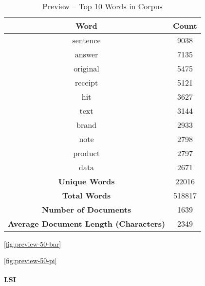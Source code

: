 \documentclass[letterpaper,12pt]{article}
\begin{document}
\begin{table}
	\caption{\label{tab:preview_top_words} Preview -- Top 10 Words in Corpus}
	\begin{center}
		\begin{tabular}{|c|c|}
			\hline
			\textbf{Word} & \textbf{Count} \\
			\hline
			sentence & 9038 \\
			\hline
			answer & 7135 \\
			\hline
			original & 5475 \\
			\hline
			receipt & 5121 \\
			\hline
			hit & 3627 \\
			\hline
			text & 3144 \\
			\hline
			brand & 2933 \\
			\hline
			note & 2798 \\
			\hline
			product & 2797 \\
			\hline
			data & 2671 \\
			\hline
			\textbf{Unique Words} & 22016 \\
			\hline
			\textbf{Total Words} & 518817 \\
			\hline
			\textbf{Number of Documents} & 1639 \\
			\hline
			\textbf{Average Document Length (Characters)} & 2349 \\
			\hline
		\end{tabular}
	\end{center}
\end{table}

\ref{fig:preview-50-bar}

\ref{fig:preview-50-pi}

\newpage
\paragraph{LSI}
\end{document}
